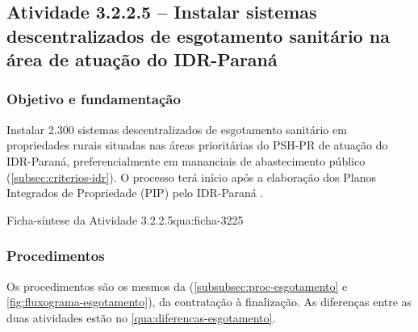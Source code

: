 \subsection{Atividade 3.2.2.5 -- Instalar sistemas descentralizados de esgotamento sanitário na área de atuação do IDR-Paraná}
\label{subsec:esgotamento-idr}

\subsubsection{Objetivo e fundamentação}

Instalar 2.300 sistemas descentralizados de esgotamento sanitário em
propriedades rurais situadas nas áreas prioritárias do PSH-PR de atuação do
IDR-Paraná, preferencialmente em mananciais de abastecimento público
(\autoref{subsec:criterios-idr}). O processo terá início após a elaboração dos
Planos Integrados de Propriedade (PIP) pelo IDR-Paraná \cite{mop2026}.

\begin{fichaatividade}{Ficha-síntese da Atividade 3.2.2.5}{qua:ficha-3225}
\end{fichaatividade}

\subsubsection{Procedimentos}

Os procedimentos são os mesmos da 
(\autoref{subsubsec:proc-esgotamento} e \autoref{fig:fluxograma-esgotamento}),
da contratação à finalização. As diferenças entre as duas atividades estão
no \autoref{qua:diferencas-esgotamento}.

